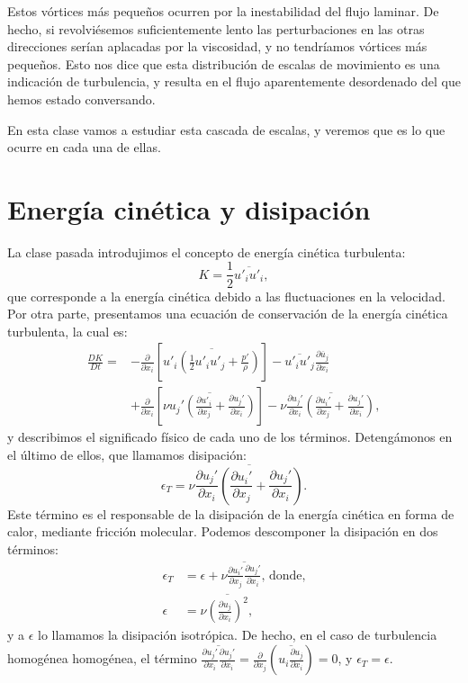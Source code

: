 Estos vórtices más pequeños ocurren por la inestabilidad del flujo laminar. 
De hecho, si revolviésemos suficientemente lento las perturbaciones en las otras direcciones serían aplacadas por la viscosidad, y no tendríamos vórtices más pequeños.
Esto nos dice que esta distribución de escalas de movimiento es una indicación de turbulencia, y resulta en el flujo aparentemente desordenado del que hemos estado conversando.

En esta clase vamos a estudiar esta cascada de escalas, y veremos que es lo que ocurre en cada una de ellas.

\section*{Energía cinética y disipación}

La clase pasada introdujimos el concepto de energía cinética turbulenta:
%
\begin{equation}
K = \frac{1}{2}\overline{u'_iu'_i},
\end{equation}
%
que corresponde a la energía cinética debido a las fluctuaciones en la velocidad.
Por otra parte, presentamos una ecuación de conservación de la energía cinética turbulenta, la cual es:
%
\begin{align}\label{eq:K_conservacion}
\frac{DK}{Dt} =& -\frac{\partial}{\partial x_i} \left[ \overline{u'_i\left(\frac{1}{2}u'_iu'_j+\frac{p'}{\rho}\right)}\right] - \overline{u'_iu'_j}\frac{\partial\overline{u}_j}{\partial x_i} \nonumber\\
               & + \frac{\partial}{\partial x_i}\left[\overline{\nu u_j'\left(\frac{\partial u'_i}{\partial x_j} + \frac{\partial u_j'}{\partial x_i}\right)}\right] -\nu\overline{\frac{\partial u_j'}{\partial x_i}\left(\frac{\partial u_i'}{\partial x_j}+\frac{\partial u_j'}{\partial x_i}\right)},
\end{align}
%
y describimos el significado físico de cada uno de los términos.
Detengámonos en el último de ellos, que llamamos disipación:
%
\begin{equation}\label{eq:disipacion}
\epsilon_T = \nu\overline{\frac{\partial u_j'}{\partial x_i}\left(\frac{\partial u_i'}{\partial x_j}+\frac{\partial u_j'}{\partial x_i}\right)}.
\end{equation}
%
Este término es el responsable de la disipación de la energía cinética en forma de calor, mediante fricción molecular. 
Podemos descomponer la disipación en dos términos:
%
\begin{align} \label{eq:disipacion_iso}
\epsilon_T &= \epsilon + \nu\overline{\frac{\partial u_i'}{\partial x_j}\frac{\partial u_j'}{\partial x_i}} \text{, donde,} \nonumber \\
\epsilon &= \nu\overline{\left(\frac{\partial u_j}{\partial x_i}\right)^2},
\end{align}
%
y a $\epsilon$ lo llamamos la disipación isotrópica.
De hecho, en el caso de turbulencia homogénea homogénea, el término $\overline{\frac{\partial u_j'}{\partial x_i}\frac{\partial u_j'}{\partial x_i}}= \frac{\partial}{\partial x_j}\left(\overline{u_i\frac{\partial u_j}{\partial x_i}}\right) = 0$, y $\epsilon_T=\epsilon$.

